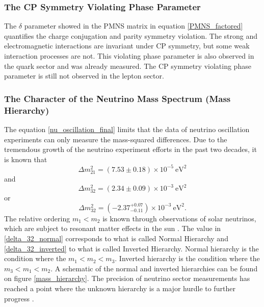\subsubsection{The CP Symmetry Violating Phase Parameter}

The $\delta$ parameter showed in the PMNS matrix in equation \ref{PMNS_factored} quantifies the charge conjugation and parity symmetry violation. The strong and electromagnetic interactions are invariant under CP symmetry, but some weak interaction processes are not. This violating phase parameter is also observed in the quark sector and was already measured. The CP symmetry violating phase parameter is still not observed in the lepton sector.



\subsubsection{The Character of the Neutrino Mass Spectrum (Mass Hierarchy)}

The equation \ref{nu_oscillation_final} limits that the data of neutrino oscillation experiments can only measure the mass-squared differences. Due to the tremendous growth of the neutrino experiment efforts in the past two decades, it is known that \cite{delta_2_1}
%
\begin{equation}
	\Delta m^2_{21} = (7.53 \pm 0.18) \times 10^{-5} \ \text{eV}^2
	\label{delta_21}
\end{equation}
%
and \cite{delta_3_2}
%
\begin{equation}
	\Delta m^2_{32} = (2.34 \pm 0.09) \times 10^{-3} \ \text{eV}^2
	\label{delta_32_normal}
\end{equation}
%
or 
%
\begin{equation}
	\Delta m^2_{32} = (-2.37^{+0.07}_{-0.11}) \times 10^{-3} \ \text{eV}^2.
	\label{delta_32_inverted}
\end{equation}
%
The relative ordering $m_1 < m_2$ is known through observations of solar neutrinos, which are subject to resonant matter effects in the sun \cite{delta_2_1}. The value in \ref{delta_32_normal} corresponds to what is called Normal Hierarchy and \ref{delta_32_inverted} to what is called Inverted Hierarchy. Normal hierarchy is the condition where the $m_1 < m_2 < m_3$. Inverted hierarchy is the condition where the $m_3 < m_1 < m_2$. A schematic of the normal and inverted hierarchies can be found on figure \ref{mass_hierarchy}. The precision of neutrino sector measurements has reached a point where the unknown hierarchy is a major hurdle to further progress \cite{prospects_patterson}.

